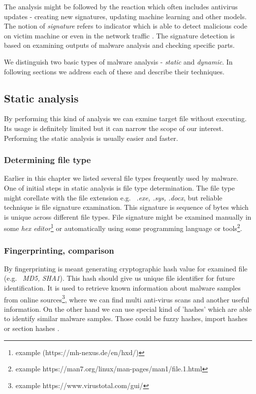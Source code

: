 The analysis might be followed by the reaction which often includes antivirus updates - creating new signatures, updating machine learning and other models. The notion of \emph{signature} refers to indicator which is able to detect malicious code on victim machine or even in the network traffic \cite{Sikorski2012}. The signature detection is based on examining outputs of malware analysis and checking specific parts.

We distinguish two basic types of malware analysis - \emph{static} and \emph{dynamic}. In following sections we address each of these and describe their techniques.

\subsection{Static analysis}
By performing this kind of analysis we can exmine target file without executing. Its usage is definitely limited but it can narrow the scope of our interest. \cite{KA2018} Performing the static analysis is usually easier and faster. \cite{Sikorski2012}

\subsubsection{Determining file type}
Earlier in this chapter we listed several file types frequently used by malware. One of initial steps in static analysis is file type determination. The file type might corellate with the file extension e.g. \ \emph{.exe, .sys, .docx}, but reliable technique is file signature examination. This signature is sequence of bytes which is unique across different file types. File signature might be examined manually in some \emph{hex editor}\footnote{example (https://mh-nexus.de/en/hxd/)} or automatically using some programming language or tools\footnote{example https://man7.org/linux/man-pages/man1/file.1.html}. \cite{KA2018} 


\subsubsection{Fingerprinting, comparison}
By fingerprinting is meant generating cryptographic hash value for examined file (e.g. \ \emph{MD5, SHA1}). This hash should give us unique file identifier for future identification. It is used to retrieve known information about malware samples from online sources\footnote{example https://www.virustotal.com/gui/}, where we can find multi anti-virus scans and another useful information. On the other hand we can use special kind of 'hashes' which are able to identify similar malware samples. Those could be fuzzy hashes, import hashes or section hashes \cite{KA2018}.

